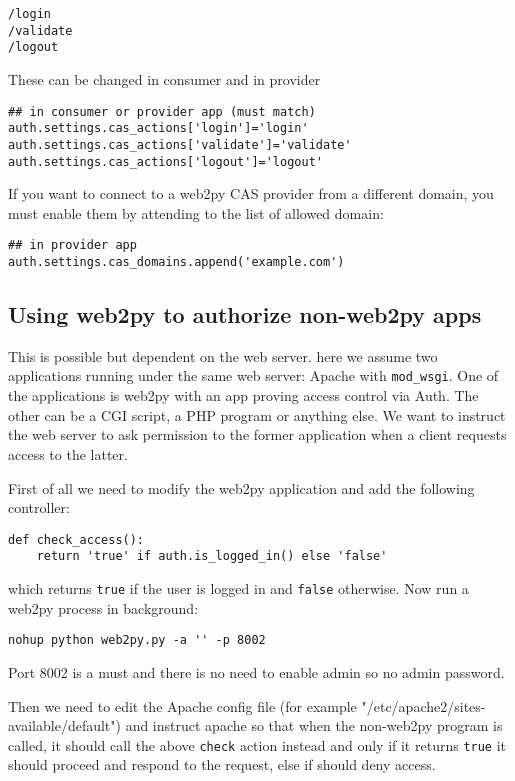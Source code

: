 \documentclass[justified,sixbynine,notoc]{tufte-book}
\def\ft{\small\tt}
\begin{document}
\begin{fullwidth}
\begin{lstlisting}
/login
/validate
/logout
\end{lstlisting}

These can be changed in consumer and in provider

\begin{lstlisting}
## in consumer or provider app (must match)
auth.settings.cas_actions['login']='login'
auth.settings.cas_actions['validate']='validate'
auth.settings.cas_actions['logout']='logout'
\end{lstlisting}

If you want to connect to a web2py CAS provider from a different domain, you must enable them by attending to the list of allowed domain:

\begin{lstlisting}
## in provider app
auth.settings.cas_domains.append('example.com')
\end{lstlisting}

\goodbreak\subsection{Using web2py to authorize non-web2py apps}

This is possible but dependent on the web server.
here we assume two applications running under the same web server: Apache with {\ft mod\_wsgi}.
One of the applications is web2py with an app proving access control via Auth.
The other can be a CGI script, a PHP program or anything else.
We want to instruct the web server to ask permission to the former application when a client requests access to the latter.

First of all we need to modify the web2py application and add the following controller:

\begin{lstlisting}
def check_access():
    return 'true' if auth.is_logged_in() else 'false'
\end{lstlisting}
\noindent which returns {\ft true} if the user is logged in and {\ft false} otherwise. Now run a web2py process in background:

\begin{lstlisting}
nohup python web2py.py -a '' -p 8002
\end{lstlisting}

Port 8002 is a must and there is no need to enable admin so no admin password.

Then we need to edit the Apache config file (for example "/etc/apache2/sites-available/default") and instruct apache so that when the non-web2py program is called, it should call the above {\ft check} action instead and only if it returns {\ft true} it should proceed and respond to the request, else if should deny access.


\end{fullwidth}
\end{document}
